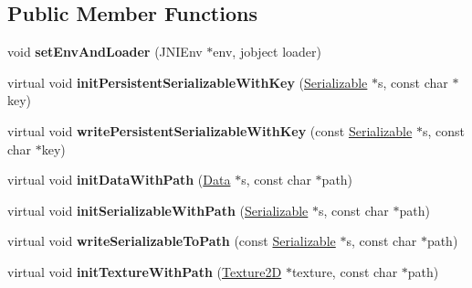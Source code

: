 \subsection*{Public Member Functions}
\begin{DoxyCompactItemize}
\item 
\hypertarget{classg2c_1_1_android_bank_aad85a368a02c958e38f76dcf299fe593}{
void {\bfseries setEnvAndLoader} (JNIEnv $\ast$env, jobject loader)}
\label{classg2c_1_1_android_bank_aad85a368a02c958e38f76dcf299fe593}

\item 
\hypertarget{classg2c_1_1_android_bank_a98167dbfc1a6f50bbab5fde5c24a741d}{
virtual void {\bfseries initPersistentSerializableWithKey} (\hyperlink{classg2c_1_1_serializable}{Serializable} $\ast$s, const char $\ast$key)}
\label{classg2c_1_1_android_bank_a98167dbfc1a6f50bbab5fde5c24a741d}

\item 
\hypertarget{classg2c_1_1_android_bank_aedc069a046331b8047cd1161e2b3e097}{
virtual void {\bfseries writePersistentSerializableWithKey} (const \hyperlink{classg2c_1_1_serializable}{Serializable} $\ast$s, const char $\ast$key)}
\label{classg2c_1_1_android_bank_aedc069a046331b8047cd1161e2b3e097}

\item 
\hypertarget{classg2c_1_1_android_bank_a18d70ba1a018c6c316264988e64585df}{
virtual void {\bfseries initDataWithPath} (\hyperlink{classg2c_1_1_data}{Data} $\ast$s, const char $\ast$path)}
\label{classg2c_1_1_android_bank_a18d70ba1a018c6c316264988e64585df}

\item 
\hypertarget{classg2c_1_1_android_bank_aa0a295f281e919633e2e57fea8ed0284}{
virtual void {\bfseries initSerializableWithPath} (\hyperlink{classg2c_1_1_serializable}{Serializable} $\ast$s, const char $\ast$path)}
\label{classg2c_1_1_android_bank_aa0a295f281e919633e2e57fea8ed0284}

\item 
\hypertarget{classg2c_1_1_android_bank_a465bc912a08c521daa9abc70acbf1d31}{
virtual void {\bfseries writeSerializableToPath} (const \hyperlink{classg2c_1_1_serializable}{Serializable} $\ast$s, const char $\ast$path)}
\label{classg2c_1_1_android_bank_a465bc912a08c521daa9abc70acbf1d31}

\item 
\hypertarget{classg2c_1_1_android_bank_a4c3ec519498c068bb19d508de50596ba}{
virtual void {\bfseries initTextureWithPath} (\hyperlink{classg2c_1_1_texture2_d}{Texture2D} $\ast$texture, const char $\ast$path)}
\label{classg2c_1_1_android_bank_a4c3ec519498c068bb19d508de50596ba}


\end{DoxyCompactItemize}
